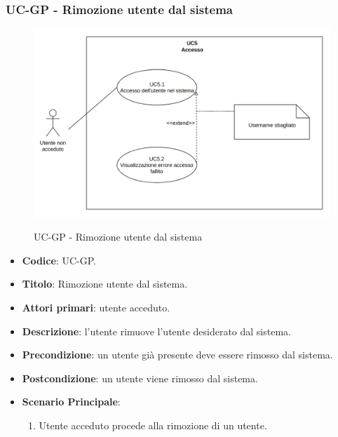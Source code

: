 \subsubsection{UC\theuccount-GP - Rimozione utente dal sistema}
		\begin{figure}[H]
			\centering
				\includegraphics[width=\columnwidth]{img/UC5.png}\\
			\caption{UC\theuccount-GP - Rimozione utente dal sistema}
		\end{figure}
	\begin{itemize}
		\item \textbf{Codice}: UC\theuccount-GP.
		\item \textbf{Titolo}: Rimozione utente dal sistema.
		\item \textbf{Attori primari}: utente acceduto.
		\item \textbf{Descrizione}: l'utente rimuove l'utente desiderato dal sistema.
		\item \textbf{Precondizione}: un utente già presente deve essere rimosso dal sistema.
		\item \textbf{Postcondizione}: un utente viene rimosso dal sistema.
		\item \textbf{Scenario Principale}:
		\begin{enumerate}
			\item Utente acceduto procede alla rimozione di un utente.
		\end{enumerate}
\end{itemize}


